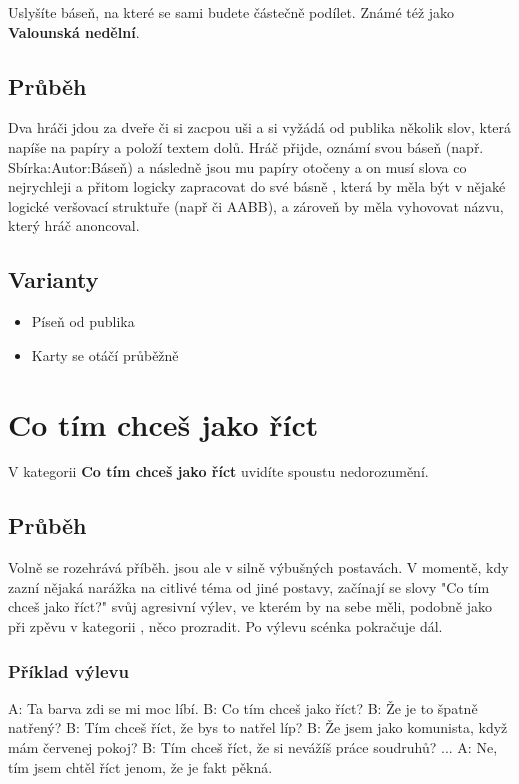  
Uslyšíte báseň, na které se sami budete částečně podílet. 
Známé též jako \textbf{Valounská nedělní}{}. 
 
\subsection{Průběh} Dva hráči jdou za dveře či si zacpou uši a  si vyžádá od publika několik slov, která napíše na papíry a položí textem dolů. 
Hráč přijde, oznámí svou báseň (např. Sbírka:Autor:Báseň) a následně jsou mu papíry otočeny a on musí slova co nejrychleji a přitom logicky zapracovat do své básně , 
která by měla být v nějaké logické veršovací struktuře (např  či AABB), a zároveň by měla vyhovovat názvu, který hráč anoncoval. 
 
 
\subsection{ Varianty } \begin{itemize}
\item Píseň od publika
\item Karty se otáčí průběžně
\end{itemize}
 
 
 
 
\needspace{5cm} \section{Co tím chceš jako říct} \label{co tím chceš jako říct}  
 
V kategorii \textbf{Co tím chceš jako říct}{} uvidíte spoustu nedorozumění. 
 
 
\subsection{ Průběh } Volně se rozehrává příběh.  jsou ale v silně výbušných postavách. V momentě, kdy zazní nějaká narážka na citlivé téma od jiné postavy, začínají se slovy "Co tím chceš jako říct?"{} svůj agresivní výlev, ve kterém by na sebe měli, podobně jako při zpěvu v kategorii , něco prozradit. Po výlevu scénka pokračuje dál. 
 
\subsubsection{ Příklad výlevu } A: Ta barva zdi se mi moc líbí. 
B: Co tím chceš jako říct? 
B: Že je to špatně natřený? 
B: Tím chceš říct, že bys to natřel líp? 
B: Že jsem jako komunista, když mám červenej pokoj? 
B: Tím chceš říct, že si nevážíš práce soudruhů? 
... 
A: Ne, tím jsem chtěl říct jenom, že je fakt pěkná. 
 
